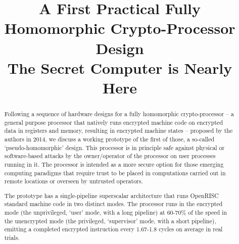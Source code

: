 \documentclass[conference]{IEEEtran}
\begin{document}
\title{A First Practical Fully Homomorphic Crypto-Processor Design\\[1ex]
\Large The Secret Computer is Nearly Here}


\author{
\and
}

\maketitle

\begin{abstract}
Following a sequence of hardware designs for a fully homomorphic
crypto-processor -- a general purpose processor that natively runs
encrypted machine code on encrypted data in registers and
memory, resulting in encrypted machine states -- proposed by the authors
in 2014, we discuss a working prototype of the first of those, a
so-called `pseudo-homomorphic' design.  This processor is in principle
safe against physical or software-based attacks by the owner/operator of
the processor on user processes running in it.  The processor is
intended as a more secure option for those emerging computing paradigms
that require trust to be placed in computations carried out in remote
locations or overseen by untrusted operators.

The prototype has a single-pipeline superscalar architecture that runs
OpenRISC standard machine code in two distinct modes.  The processor
runs in the encrypted mode (the unprivileged, `user' mode, with a long
pipeline) at 60-70\% of the speed in the unencrypted mode (the
privileged, `supervisor' mode, with a short pipeline), emitting a
completed encrypted instruction every 1.67-1.8 cycles on average in real
trials.

\end{abstract}




\IEEEpeerreviewmaketitle
\end{document}
